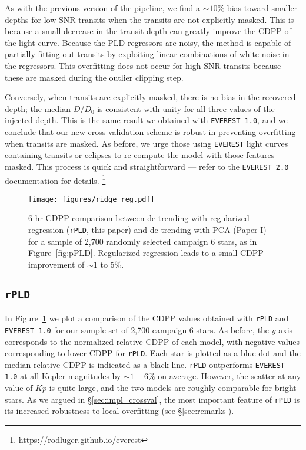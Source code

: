 \documentclass[]{emulateapj}
\newcommand{\Kp}{\ensuremath{Kp}}
\newcommand{\edited}[1]{{\color{red} #1}}
\begin{document}
As with the previous version of the pipeline, we find a ${\sim}10\%$ bias toward
smaller depths for low SNR transits when the transits are not explicitly masked. This
is because a small decrease in the transit depth can greatly improve the CDPP
of the light curve. Because the PLD regressors are noisy, the method is capable
of partially fitting out transits by exploiting linear combinations of white noise
in the regressors. This overfitting does not occur for high SNR transits because these
are masked during the outlier clipping step.

Conversely, when transits are explicitly masked, there is no bias in the recovered
depth; the median $D/D_0$ is consistent with unity for all three values of the injected
depth. This is the same result we obtained with \texttt{EVEREST 1.0}, and we conclude
that our new cross-validation scheme is robust in preventing overfitting when transits
are masked. As before, we urge those using \texttt{EVEREST} light curves containing
transits or eclipses to re-compute the model with those features masked. This process
is quick and straightforward --- refer to the \texttt{EVEREST 2.0} documentation for
details.
\footnote{\edited{\url{https://rodluger.github.io/everest}}}\\[0em]

\begin{figure}[hbt]
  \begin{center}
      \texttt{[image: figures/ridge\_reg.pdf]}
       \caption{6 hr CDPP comparison between de-trending with regularized regression (\texttt{rPLD}, this paper) and
                de-trending with PCA (Paper I) for a sample of 2,700 randomly selected campaign 6
                stars, as in Figure~\ref{fig:pPLD}. Regularized regression leads to a small CDPP improvement of
                ${\sim}1$ to 5\%.}
     \label{fig:rPLD}
  \end{center}
\end{figure}

\subsection{\texttt{rPLD}}
In Figure~\ref{fig:rPLD} we plot a comparison of the CDPP values obtained with \texttt{rPLD}
and \texttt{EVEREST 1.0} for our sample set of 2,700 campaign 6 stars. As before, the $y$
axis corresponds to the normalized relative CDPP of each model, with negative values
corresponding to lower CDPP for \texttt{rPLD}. Each star is plotted as a blue dot and the median
relative CDPP is indicated as a black line. \texttt{rPLD} outperforms \texttt{EVEREST 1.0} at all
Kepler magnitudes by ${\sim}1-6\%$ on average. However, the scatter at any value of
$\Kp$ is quite large, and the two models are roughly comparable for bright stars. As we
argued in \S\ref{sec:impl_crossval}, the most important feature of \texttt{rPLD} is
its increased robustness to local overfitting (see \S\ref{sec:remarks}).\\[0em]
\end{document}
